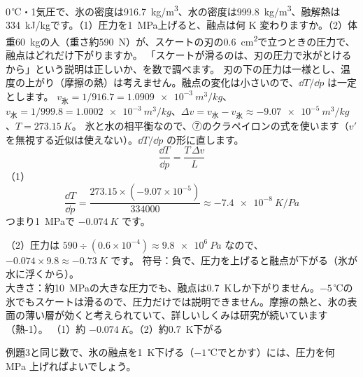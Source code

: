 \label{ph:熱-10:ex3}
\begin{phreidai}
0\,℃・1気圧で、氷の密度は\qty{916.7}{kg/m^3}、水の密度は\qty{999.8}{kg/m^3}、融解熱は\qty{334}{kJ/kg}です。（1）圧力を\qty{1}{MPa}上げると、融点は何 K 変わりますか。（2）体重\qty{60}{kg}の人（重さ約\qty{590}{N}）が、スケートの刃の\qty{0.6}{cm^2}で立つときの圧力で、融点はどれだけ下がりますか。
\phbamen
「スケートが滑るのは、刃の圧力で氷がとけるから」という説明は正しいか、を数で調べます。
\phmushi
刃の下の圧力は一様とし、温度の上がり（摩擦の熱）は考えません。融点の変化は小さいので、$\dd T/\dd p$ は一定とします。
\phzu
$v_{\text{氷}}=1/916.7=\qty{1.0909e-3}{m^3/kg}$、$v_{\text{水}}=1/999.8=\qty{1.0002e-3}{m^3/kg}$、$\Delta v=v_{\text{水}}-v_{\text{氷}}\approx\qty{-9.07e-5}{m^3/kg}$、$T=\qty{273.15}{K}$。
\phriyu
氷と水の相平衡なので、⑦のクラペイロンの式を使います（$v'$ を無視する近似は使えない）。$\dd T/\dd p$ の形に直します。
\phtateru
\[\frac{\dd T}{\dd p}=\frac{T\,\Delta v}{L}\]
\phtoku
（1）
\[\frac{\dd T}{\dd p}=\frac{273.15\times(-9.07\times10^{-5})}{334000}\approx\qty{-7.4e-8}{K/Pa}\]
つまり\qty{1}{MPa}で $\qty{-0.074}{K}$ です。\par
（2）圧力は $590\div(0.6\times10^{-4})\approx\qty{9.8e6}{Pa}$ なので、$-0.074\times9.8\approx\qty{-0.73}{K}$ です。
\phtashikame
符号：負で、圧力を上げると融点が下がる（氷が水に浮くから）。\\
大きさ：約\qty{10}{MPa}の大きな圧力でも、融点は\qty{0.7}{K}しか下がりません。$-5$\,℃の氷でもスケートは滑るので、圧力だけでは説明できません。摩擦の熱と、氷の表面の薄い層が効くと考えられていて、詳しいしくみは研究が続いています（熱-1）。
\kotae （1）約 $\qty{-0.074}{K}$。（2）約\qty{0.7}{K}下がる
\end{phreidai}
\begin{jibun}
例題3と同じ数で、氷の融点を\qty{1}{K}下げる（$-1$\,℃でとかす）には、圧力を何 MPa 上げればよいでしょう。
\end{jibun}

